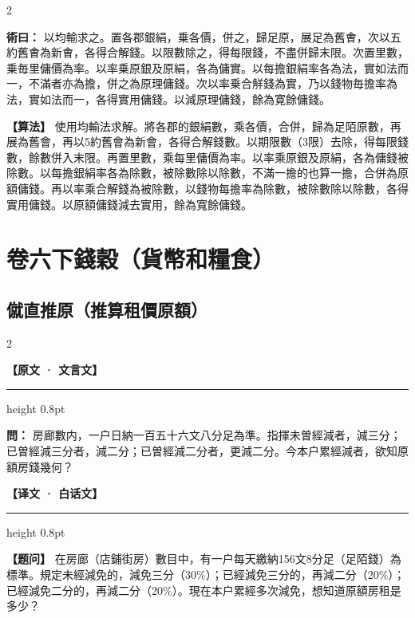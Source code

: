 \documentclass[11pt,a4paper]{article}
\newcommand{\ClassicalQuestion}[1]{\par\noindent\textbf{\color{problemcolor}問：}#1\par}
\newcommand{\ClassicalMethod}[1]{\par\noindent\textbf{\color{methodcolor}術曰：}#1\par}
\newcommand{\ModernQuestion}[1]{\par\noindent\textbf{\color{modernlabel}【题问】}#1\par}
\newcommand{\ModernMethod}[1]{\par\noindent\textbf{\color{methodcolor}【算法】}#1\par}
\newcommand{\ClassicalHeader}{%
  \begin{center}\textbf{\color{headerclassical}【原文 · 文言文】}\end{center}
  \vspace{-0.5em}
  \hrule height 0.8pt
  \vspace{0.5em}
}
\newcommand{\ModernHeader}{%
  \begin{center}\textbf{\color{headermodern}【译文 · 白话文】}\end{center}
  \vspace{-0.5em}
  \hrule height 0.8pt
  \vspace{0.5em}
}
\begin{document}
\begin{paracol}{2}

\ClassicalMethod{%
以均輸求之。置各郡銀絹，乗各價，併之，歸足原，展足為舊㑹，次以五約舊㑹為新㑹，各得合解錢。以限數除之，得每限錢，不盡併歸末限。次置里數，乗毎里傭價為率。以率乗原銀及原絹，各為傭實。以每擔銀絹率各為法，實如法而一，不滿者亦為擔，併之為原理傭錢。次以率乗合觧錢為實，乃以錢物毎擔率為法，實如法而一，各得實用傭錢。以減原理傭錢，餘為寛餘傭錢。}

\switchcolumn

\ModernMethod{%
使用均輸法求解。將各郡的銀絹數，乘各價，合併，歸為足陌原數，再展為舊會，再以5約舊會為新會，各得合解錢數。以期限數（3限）去除，得每限錢數，餘數併入末限。再置里數，乘每里傭價為率。以率乘原銀及原絹，各為傭錢被除數。以每擔銀絹率各為除數，被除數除以除數，不滿一擔的也算一擔，合併為原額傭錢。再以率乘合解錢為被除數，以錢物每擔率為除數，被除數除以除數，各得實用傭錢。以原額傭錢減去實用，餘為寬餘傭錢。
}

\end{paracol}



\newpage
\section*{\color{titlecolor}卷六下\quad 錢穀（貨幣和糧食）}

\subsection*{\color{sectioncolor}僦直推原（推算租價原額）}

\begin{paracol}{2}

\ClassicalHeader

\ClassicalQuestion{%
房廊數内，一户日納一百五十六文八分足為準。指揮未曽經減者，減三分；已曽經減三分者，減二分；已曽經減二分者，更減二分。今本户累經減者，欲知原額房錢幾何？}

\switchcolumn

\ModernHeader

\ModernQuestion{%
在房廊（店鋪街房）數目中，有一户每天繳納156文8分足（足陌錢）為標準。規定未經減免的，減免三分（30\%）；已經減免三分的，再減二分（20\%）；已經減免二分的，再減二分（20\%）。現在本户累經多次減免，想知道原額房租是多少？
}

\end{paracol}
\end{document}
